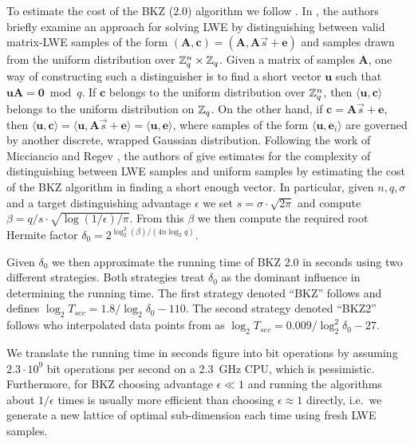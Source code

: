 To estimate the cost of the BKZ ($2.0$) algorithm we follow \cite{micciancio-regev:pqc2009,LindnerP10}. In \cite{micciancio-regev:pqc2009}, the authors briefly examine an approach for solving LWE by distinguishing between valid matrix-LWE samples of the form $(\mathbf{A},\mathbf{c})=(\mathbf{A},\mathbf{A}\vec{s}+\mathbf{e})$ and samples drawn from the uniform distribution over $\mathbb{Z}_q^n\times\mathbb{Z}_q$. Given a matrix of samples $\mathbf{A}$, one way of constructing such a distinguisher is to find a short vector $\mathbf{u}$ such that $\mathbf{u}\mathbf{A}=\mathbf{0}\bmod q$. If $\mathbf{c}$ belongs to the uniform distribution over $\mathbb{Z}_q^n$, then $\langle\mathbf{u},\mathbf{c}\rangle$ belongs to the uniform distribution on $\mathbb{Z}_q$. On the other hand, if $\mathbf{c}=\mathbf{A}\vec{s}+\mathbf{e}$, then $\langle\mathbf{u},\mathbf{c}\rangle=\langle\mathbf{u},\mathbf{A}\vec{s}+\mathbf{e}\rangle=\langle\mathbf{u},\mathbf{e}\rangle$, where samples of the form $\langle\mathbf{u},\mathbf{e}_i\rangle$ are governed by another discrete, wrapped Gaussian distribution. Following the work of Micciancio and Regev \cite{micciancio-regev:pqc2009}, the authors of \cite{LindnerP10} give estimates for the complexity of distinguishing between LWE samples and uniform samples by estimating the cost of the BKZ algorithm in finding a short enough vector. In particular, given $n, q, \sigma$ and a target distinguishing advantage $\epsilon$ we set $s = \sigma \cdot \sqrt{2\pi}$ and compute $\beta = q/s \cdot \sqrt{\log(1/\epsilon)/\pi}$. From this $\beta$ we then compute the required root Hermite factor $\delta_0 = 2^{ \log_2^2(\beta) / (4n\log_2 q ) }$. 

Given $\delta_0$ we then approximate the running time of BKZ 2.0 in seconds using two different strategies. Both strategies treat $\delta_0$ as the dominant influence in determining the running time.  The first strategy denoted ``BKZ'' follows \cite{LindnerP10} and defines $\log_2 T_{sec} = 1.8/\log_2 \delta_0 - 110$. The second strategy denoted ``BKZ2'' follows \cite{albrecht-cid-faugere-fitzpatrick-perret:dcc2013} who interpolated data points from \cite{liu-nguyen:ctrsa2013} as $\log_2 T_{sec} = 0.009/\log^2_2 \delta_0 - 27$.

We translate the running time in seconds figure into bit operations by assuming $2.3 \cdot 10^9$ bit operations per second on a 2.3~GHz CPU, which is pessimistic. Furthermore, for BKZ choosing advantage $\epsilon \ll 1$ and running the algorithms about $1/\epsilon$ times is usually more efficient than choosing $\epsilon \approx 1$ directly, i.e.\ we generate a new lattice of optimal sub-dimension each time using fresh LWE samples.

